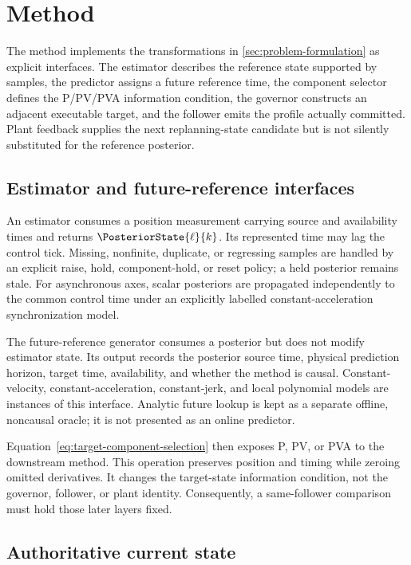 \section{Method}
\label{sec:method}

The method implements the transformations in
\cref{sec:problem-formulation} as explicit interfaces.  The estimator describes
the reference state supported by samples, the predictor assigns a future
reference time, the component selector defines the P/PV/PVA information
condition, the governor constructs an adjacent executable target, and the
follower emits the profile actually committed.  Plant feedback supplies the
next replanning-state candidate but is not silently substituted for the
reference posterior.

\subsection{Estimator and future-reference interfaces}

An estimator consumes a position measurement carrying source and availability
times and returns \(\PosteriorState{\ell}{k}\).  Its represented time may lag
the control tick.  Missing, nonfinite, duplicate, or regressing samples are
handled by an explicit raise, hold, component-hold, or reset policy; a held
posterior remains stale.  For asynchronous axes, scalar posteriors are
propagated independently to the common control time under an explicitly
labelled constant-acceleration synchronization model.

The future-reference generator consumes a posterior but does not modify
estimator state.  Its output records the posterior source time, physical
prediction horizon, target time, availability, and whether the method is
causal.  Constant-velocity, constant-acceleration, constant-jerk, and local
polynomial models are instances of this interface.  Analytic future lookup is
kept as a separate offline, noncausal oracle; it is not presented as an online
predictor.

Equation~\eqref{eq:target-component-selection} then exposes P, PV, or PVA to
the downstream method.  This operation preserves position and timing while
zeroing omitted derivatives.  It changes the target-state information
condition, not the governor, follower, or plant identity.  Consequently, a
same-follower comparison must hold those later layers fixed.

\subsection{Authoritative current state}

